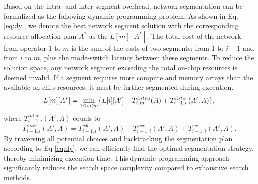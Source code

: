 Based on the intra- and inter-segment overhead, network segmentation can be formalized as the following dynamic programming problem.
As shown in Eq. \ref{eq:dy}, we denote the best network segment solution with the corresponding resource allocation plan $A^*$ as the $L[m][A^*]$. The total cost of the network from operator 1 to $m$ is the sum of the costs of two segments: from 1 to $i-1$ and from $i$ to $m$, plus the mode-switch latency between these segments. To reduce the solution space, any network segment exceeding the total on-chip resources is deemed invalid. %
If a segment requires more compute and memory arrays than the available on-chip resources, it must be further segmented during execution.
\begin{equation}
    L[m][A^*] = \min_{1 \leq i < m} \{L[i][A'] + T_{i, m}^{intra}(A) + T_{i-1, i}^{inter}(A',A)\}, \\
    \label{eq:dy}
\end{equation}
where $T_{i-1, i}^{inter}(A',A)$ equals to 
\begin{equation}
    T_{i-1, i}^{inter}(A',A) = T_{i-1, i}^{wb}(A',A)+T_{i-1, i}^{swc}(A',A)+T_{i-1, i}^{rw}(A',A).
    \label{eq:inter}
\end{equation}
By traversing all potential choices and backtracking the segmentation plan according to Eq \ref{eq:dy}, we can efficiently find the optimal segmentation strategy, thereby minimizing execution time. This dynamic programming approach significantly reduces the search space complexity compared to exhaustive search methods.


